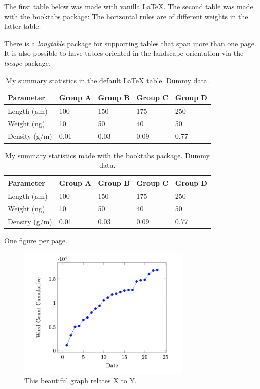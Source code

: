 \documentclass[11pt,letterpaper]{article}
\begin{document}
The first table below was made with vanilla LaTeX.
The second table was made with the booktabs package: The horizontal rules are of different weights in the latter table.

There is a \emph{longtable} package for supporting tables that span more than one page.
It is also possible to have tables oriented in the landscape orientation via the \emph{lscape} package.



\newpage

\begin{table}[htp]
  \centering
  \caption{\label{tab:first} My summary statistics in the default LaTeX table. Dummy data.}
\begin{tabular}{lllll}\hline
 Parameter & Group A & Group B & Group C &  Group D \\ \hline
 Length ($\mu$m) & 100 & 150 & 175 &  250\\
 Weight (ng)  &  10 &  50 & 40  &  50\\
 Density (g/m) & 0.01  & 0.03  &  0.09 &  0.77\\ \hline
\end{tabular}
\end{table}


\newpage


\begin{table}[htp]
  \centering
  \caption{\label{tab:second} My summary statistics made with the booktabs package. Dummy data.}
\begin{tabular}{lllll}\toprule %
 Parameter & Group A & Group B & Group C &  Group D \\ \midrule
 Length ($\mu$m) & 100 & 150 & 175 &  250\\
 Weight (ng)  &  10 &  50 & 40  &  50\\
 Density (g/m) & 0.01  & 0.03  &  0.09 &  0.77\\ \bottomrule
\end{tabular}
\end{table}


\newpage
\listoffigures
One figure per page. 

\newpage

\begin{figure}[htp]
  \begin{center}
  \includegraphics[width=3.25in]{./figs/wcPlot}
  \caption{\label{fig:labelA} This beautiful graph relates X to Y. }
  \end{center}
\end{figure}
\end{document}

